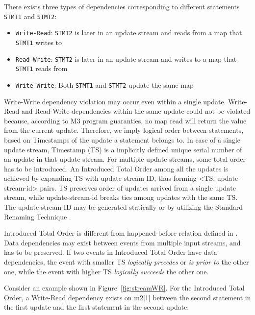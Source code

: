 \documentclass{sig-semester}
\def\M3{M3\xspace}
\begin{document}
There exists three types of dependencies corresponding to different statements \texttt{STMT1} and \texttt{STMT2}:
\begin{itemize}
 \item \texttt{Write-Read}: \texttt{STMT2} is later in an update stream and reads from a map that \texttt{STMT1} writes to
 \item \texttt{Read-Write}: \texttt{STMT2} is later in an update stream and writes to a map that \texttt{STMT1} reads from
 \item \texttt{Write-Write}: Both \texttt{STMT1} and \texttt{STMT2} update the same map
\end{itemize}

Write-Write dependency violation may occur even within a single update. Write-Read and Read-Write dependencies within the same update could not be violated because, according to \M3 program guaranties, no map read will return the value from the current update. Therefore, we imply logical order between statements, based on Timestamps of the update a statement belongs to. In case of a single update stream, Timestamp (TS) is a implicitly defined unique serial number of an update in that update stream. For multiple update streams, some total order has to be introduced. An Introduced Total Order among all the updates is achieved by expanding TS with update stream ID, thus forming <TS, update-stream-id> pairs. TS preserves order of updates arrived from a single update stream, while update-stream-id breaks ties among updates with the same TS. The update stream ID may be generated statically or by utilizing the Standard Renaming Technique \cite{Welch04}.

Introduced Total Order is different from happened-before relation defined in \cite{Lamport78}. Data dependencies may exist between events from multiple input streams, and has to be preserved. If two events in Introduced Total Order have data-dependencies, the event with smaller TS \textit{logically precedes} or \textit{is prior to} the other one, while the event with higher TS \textit{logically succeeds} the other one.

Consider an example shown in Figure~\ref{fig:streamWR}. For the Introduced Total Order, a Write-Read dependency exists on m2[1] between the second statement in the first update and the first statement in the second update.
\end{document}
